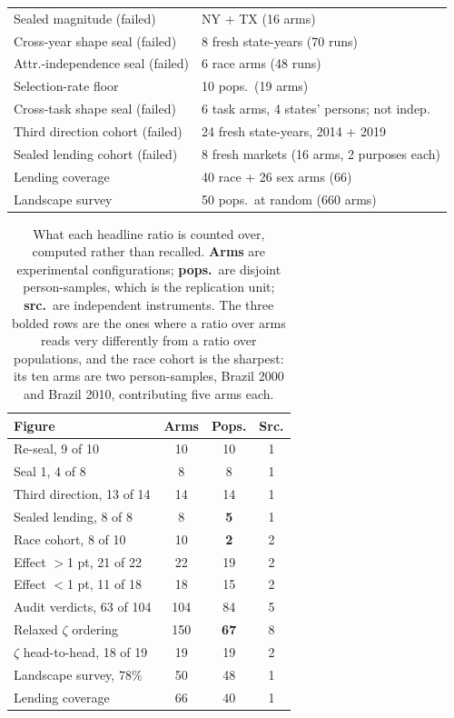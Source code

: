 \documentclass[conference]{IEEEtran}
\begin{document}
\begin{table}[t]
\begin{tabular}{@{}ll@{}}
Sealed magnitude (failed) & NY + TX (16 arms) \\
Cross-year shape seal (failed) & 8 fresh state-years (70 runs) \\
Attr.-independence seal (failed) & 6 race arms (48 runs) \\
Selection-rate floor & 10 pops.\ (19 arms) \\
Cross-task shape seal (failed) & 6 task arms, 4 states' persons; not indep. \\
Third direction cohort (failed) & 24 fresh state-years, 2014 + 2019 \\
Sealed lending cohort (failed) & 8 fresh markets (16 arms, 2 purposes each) \\
Lending coverage & 40 race + 26 sex arms (66) \\
Landscape survey & 50 pops.\ at random (660 arms) \\
\bottomrule
\end{tabular}
\end{table}

\begin{table}[t]
\caption{What each headline ratio is counted over, computed rather than recalled.
\textbf{Arms} are experimental configurations; \textbf{pops.}\ are disjoint person-samples,
which is the replication unit; \textbf{src.}\ are independent instruments. The three bolded
rows are the ones where a ratio over arms reads very differently from a ratio over
populations, and the race cohort is the sharpest: its ten arms are two person-samples,
Brazil 2000 and Brazil 2010, contributing five arms each.}
\label{tab:denominators}
\centering
\footnotesize
\setlength{\tabcolsep}{4pt}
\begin{tabular}{@{}lccc@{}}
\toprule
\textbf{Figure} & \textbf{Arms} & \textbf{Pops.} & \textbf{Src.} \\
\midrule
Re-seal, 9 of 10 & 10 & 10 & 1 \\
Seal 1, 4 of 8 & 8 & 8 & 1 \\
Third direction, 13 of 14 & 14 & 14 & 1 \\
Sealed lending, 8 of 8 & 8 & \textbf{5} & 1 \\
Race cohort, 8 of 10 & 10 & \textbf{2} & 2 \\
Effect $>$1 pt, 21 of 22 & 22 & 19 & 2 \\
Effect $<$1 pt, 11 of 18 & 18 & 15 & 2 \\
Audit verdicts, 63 of 104 & 104 & 84 & 5 \\
Relaxed $\zeta$ ordering & 150 & \textbf{67} & 8 \\
$\zeta$ head-to-head, 18 of 19 & 19 & 19 & 2 \\
Landscape survey, 78\% & 50 & 48 & 1 \\
Lending coverage & 66 & 40 & 1 \\
\bottomrule
\end{tabular}
\end{table}
\end{document}
